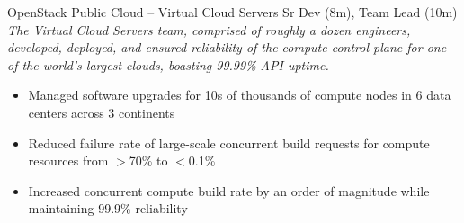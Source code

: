 \documentclass[margin,line]{resume}
\begin{document}
\begin{resume}
\vspace{4pt}
{\small OpenStack Public Cloud -- Virtual Cloud Servers  \hfill  Sr Dev (8m), Team Lead (10m)}\\
{\small\textit{The Virtual Cloud Servers team, comprised of roughly a dozen engineers, developed, deployed, and
ensured reliability of the compute control plane for one of the world's largest clouds, boasting 99.99\% API uptime.}}
\begin{itemize} \itemsep -2pt %
\small\item Managed software upgrades for 10s of thousands of compute nodes in 6 data centers across 3 continents
\small\item Reduced failure rate of large-scale concurrent build requests for compute resources from $>$70\% to $<$0.1\%
\small\item Increased concurrent compute build rate by an order of magnitude while maintaining 99.9\% reliability
\end{itemize}
\vspace{4pt}


\end{resume}
\end{document}
